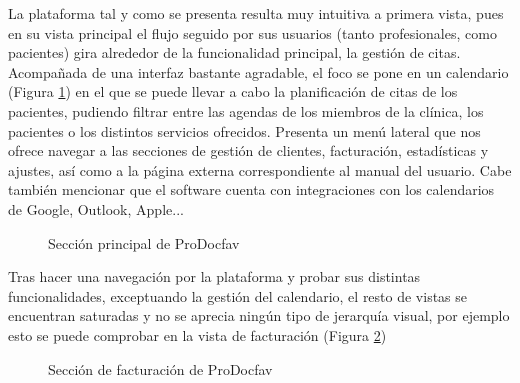 La plataforma tal y como se presenta resulta muy intuitiva a primera vista, pues en su vista principal el flujo seguido por sus usuarios (tanto profesionales, como pacientes) gira alrededor de la funcionalidad principal, la gestión de citas. Acompañada de una interfaz bastante agradable, el foco se pone en un calendario (Figura \ref{fig:docfav-calendario}) en el que se puede llevar a cabo la planificación de citas de los pacientes, pudiendo filtrar entre las agendas de los miembros de la clínica, los pacientes o los distintos servicios ofrecidos. Presenta un menú lateral que nos ofrece navegar a las secciones de gestión de clientes, facturación, estadísticas y ajustes, así como a la página externa correspondiente al manual del usuario. Cabe también mencionar que el software cuenta con integraciones con los calendarios de Google, Outlook, Apple... \bigskip

\begin{figure}[H]
    \caption{Sección principal de ProDocfav}
    \label{fig:docfav-calendario}
\end{figure}

Tras hacer una navegación por la plataforma y probar sus distintas funcionalidades, exceptuando la gestión del calendario, el resto de vistas se encuentran saturadas y no se aprecia ningún tipo de jerarquía visual, por ejemplo esto se puede comprobar en la vista de facturación (Figura \ref{fig:facturacion-docfav})

\begin{figure}[H]
    \caption{Sección de facturación de ProDocfav}
    \label{fig:facturacion-docfav}
\end{figure}

